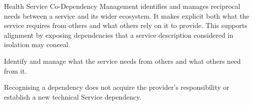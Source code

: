 Health Service Co-Dependency Management identifies and manages reciprocal needs between a service and its wider ecosystem. It makes explicit both what the service requires from others and what others rely on it to provide. This supports alignment by exposing dependencies that a service description considered in isolation may conceal.



Identify and manage what the service needs from others and what others need from it.



Recognising a dependency does not acquire the provider's responsibility or establish a new technical Service dependency.


